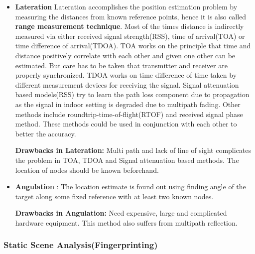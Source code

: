 \begin{itemize}
\item \textbf{Lateration}
Lateration\cite{liu} accomplishes the position estimation problem by measuring the distances from known reference points, hence it is also called \textbf{range measurement technique}. Most of the times distance is indirectly measured via either received signal strength(RSS), time of arrival(TOA) or time difference of arrival(TDOA). TOA works on the principle that time and distance positively correlate with each other and given one other can be estimated. But care has to be taken that transmitter and receiver are properly synchronized. TDOA works on time difference of time taken by different measurement devices for receiving the signal. Signal attenuation based models(RSS) try to learn the path loss component due to propagation as the signal in indoor setting is degraded due to multipath fading. Other methods include roundtrip-time-of-flight(RTOF) and received signal phase method. These methods could be used in conjunction with each other to better the accuracy.

\noindent
\textbf{Drawbacks in Lateration:} Multi path and lack of line of sight complicates the problem in TOA, TDOA and Signal attenuation based methods. The location of nodes should be known beforehand.

\item \textbf{Angulation} : The location estimate is found out using finding angle of the target along some fixed reference with at least two known nodes.

\noindent
\textbf{Drawbacks in Angulation:} Need expensive, large and complicated hardware equipment. This method also suffers from multipath reflection.
\end{itemize}

\subsubsection{Static Scene Analysis(Fingerprinting)}

